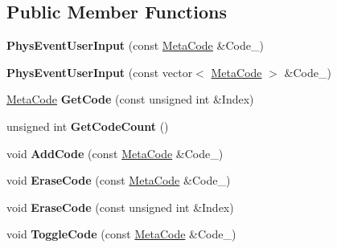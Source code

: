 \subsection*{Public Member Functions}
\begin{DoxyCompactItemize}
\item 
\hypertarget{classPhysEventUserInput_ae13b1b02bfa3ef64dc4205478a68810f}{
{\bfseries PhysEventUserInput} (const \hyperlink{classMetaCode}{MetaCode} \&Code\_\-)}
\label{dc/d0e/classPhysEventUserInput_ae13b1b02bfa3ef64dc4205478a68810f}

\item 
\hypertarget{classPhysEventUserInput_a8b1c0e36d39075dffa4f88d10f2376d9}{
{\bfseries PhysEventUserInput} (const vector$<$ \hyperlink{classMetaCode}{MetaCode} $>$ \&Code\_\-)}
\label{dc/d0e/classPhysEventUserInput_a8b1c0e36d39075dffa4f88d10f2376d9}

\item 
\hypertarget{classPhysEventUserInput_a98b12510b96dea0d660355898fa69cad}{
\hyperlink{classMetaCode}{MetaCode} {\bfseries GetCode} (const unsigned int \&Index)}
\label{dc/d0e/classPhysEventUserInput_a98b12510b96dea0d660355898fa69cad}

\item 
\hypertarget{classPhysEventUserInput_a8232572283b9dc85c96a2b28479123a8}{
unsigned int {\bfseries GetCodeCount} ()}
\label{dc/d0e/classPhysEventUserInput_a8232572283b9dc85c96a2b28479123a8}

\item 
\hypertarget{classPhysEventUserInput_a4f5b94c64cd08c15b480e441d25a385d}{
void {\bfseries AddCode} (const \hyperlink{classMetaCode}{MetaCode} \&Code\_\-)}
\label{dc/d0e/classPhysEventUserInput_a4f5b94c64cd08c15b480e441d25a385d}

\item 
\hypertarget{classPhysEventUserInput_a1dbd2996770df334fba9f67d9bb4ffa0}{
void {\bfseries EraseCode} (const \hyperlink{classMetaCode}{MetaCode} \&Code\_\-)}
\label{dc/d0e/classPhysEventUserInput_a1dbd2996770df334fba9f67d9bb4ffa0}

\item 
\hypertarget{classPhysEventUserInput_a8cbbee3c2be3bd12746ad442fce526e4}{
void {\bfseries EraseCode} (const unsigned int \&Index)}
\label{dc/d0e/classPhysEventUserInput_a8cbbee3c2be3bd12746ad442fce526e4}

\item 
\hypertarget{classPhysEventUserInput_a8325bb0172db6ea02fd06f4a5d1a7378}{
void {\bfseries ToggleCode} (const \hyperlink{classMetaCode}{MetaCode} \&Code\_\-)}
\label{dc/d0e/classPhysEventUserInput_a8325bb0172db6ea02fd06f4a5d1a7378}


\end{DoxyCompactItemize}
